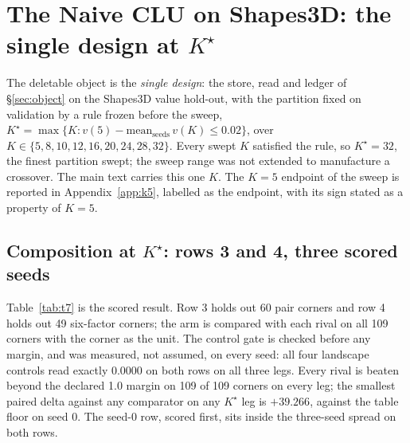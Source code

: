 \documentclass{article}
\newcommand{\Kstar}{\ensuremath{K^{\star}}}
\begin{document}
\section{The Naive CLU on Shapes3D: the single design at $\Kstar$}
\label{sec:shapes}

The deletable object is the \emph{single design}: the store, read and ledger of
\S\ref{sec:object} on the Shapes3D value hold-out, with the partition fixed on validation
by a rule frozen before the sweep, $\Kstar=\max\{K : v(5)-\text{mean}_{\text{seeds}}\,v(K)\le
0.02\}$, over $K\in\{5,8,10,12,16,20,24,28,32\}$. Every swept $K$ satisfied the rule, so
$\Kstar=32$, the finest partition swept; the sweep range was not extended to manufacture a
crossover.
The main text carries this one $K$. The $K=5$ endpoint of the sweep is reported in
Appendix~\ref{app:k5}, labelled as the endpoint, with its sign stated as a property of $K=5$.

\subsection{Composition at $\Kstar$: rows 3 and 4, three scored seeds}
\label{sec:shapes-t7}

Table~\ref{tab:t7} is the scored result. Row 3 holds out 60 pair corners and row 4 holds out
49 six-factor corners; the arm is compared with each rival on all 109 corners with the corner
as the unit.
The control gate is checked before any margin, and was measured, not assumed, on every seed:
all four landscape controls read exactly 0.0000 on both rows on all three legs.
Every rival is beaten beyond the declared 1.0 margin on 109 of 109 corners on every leg; the
smallest paired delta against any comparator on any $\Kstar$ leg is $+39.266$, against the
table floor on seed 0.
The seed-0 row, scored first, sits inside the three-seed spread on both rows.
\end{document}
